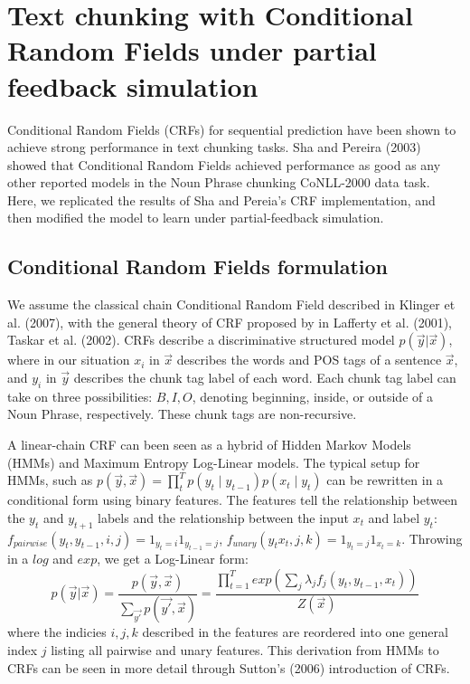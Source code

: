 \documentclass{article}
\begin{document}
\section*{Text chunking with Conditional Random Fields under partial feedback simulation}
Conditional Random Fields (CRFs) for sequential prediction have been shown to achieve strong performance in text chunking tasks. Sha and Pereira (2003) showed that Conditional Random Fields achieved performance as good as any other reported models in the Noun Phrase chunking CoNLL-2000 data task. Here, we replicated the results of Sha and Pereia's CRF implementation, and then modified the model to learn under partial-feedback simulation. 

\subsection*{Conditional Random Fields formulation}
We assume the classical chain Conditional Random Field described in Klinger et al. (2007), with the general theory of CRF proposed by in Lafferty et al. (2001), Taskar et al. (2002). CRFs describe a discriminative structured model $p(\vec{y}|\vec{x})$, where in our situation $x_{i}$ in $\vec{x}$ describes the words and POS tags of a sentence $\vec{x}$, and $y_{i}$ in $\vec{y}$ describes the chunk tag label of each word. Each chunk tag label can take on three possibilities: ${B, I, O}$, denoting beginning, inside, or outside of a Noun Phrase, respectively. These chunk tags are non-recursive. 

A linear-chain CRF can been seen as a hybrid of Hidden Markov Models (HMMs) and Maximum Entropy Log-Linear models.  The typical setup for HMMs, such as $p(\vec{y},\vec{x})=\prod_{t}^{T}p(y_{t}\mid y_{t-1})p(x_{t}\mid y_{t})$ can be rewritten in a conditional form using binary features. The features tell the relationship between the $y_{t}$ and $y_{t+1}$ labels and the relationship between the input $x_{t}$ and label $y_{t}$: $f_{pairwise}(y_{t},y_{t-1},i,j)=1_{y_{t}=i}1_{y_{t-1}=j}$,
$f_{unary}(y_{t}x_{t},j,k)=1_{y_{t}=j}1_{x_{t}=k}$. Throwing in a $log$ and $exp$, we get a Log-Linear form: 
\begin{equation}
\label{CRF1}
p(\vec{y}|\vec{x})=\frac{p(\vec{y},\vec{x})}{\sum_{\vec{y'}}p(\vec{y'},\vec{x})}=\frac{\prod_{t=1}^{T}exp(\sum_{j}\lambda_{j}f_{j}(y_{t},y_{t-1},x_{t}))}{Z(\vec{x})}
\end{equation}
where the indicies $i, j, k$ described in the features are reordered into one general index $j$ listing all pairwise and unary features. This derivation from HMMs to CRFs can be seen in more detail through Sutton's (2006) introduction of CRFs. 
\end{document}
